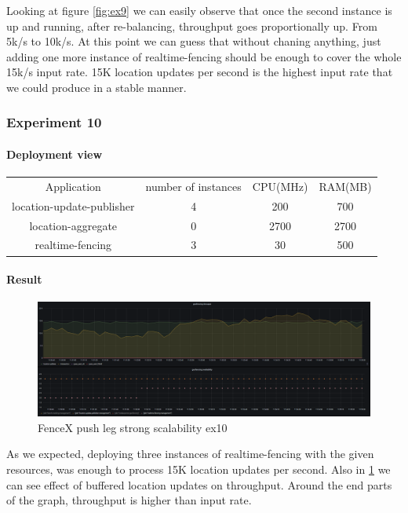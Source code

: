\documentclass[a4]{report}
\begin{document}
        Looking at figure \ref{fig:ex9} we can easily observe that once the second instance is up and running, after
        re-balancing, throughput goes proportionally up.
        From 5k/s to 10k/s.
        At this point we can guess that without chaning anything, just adding one more instance of realtime-fencing
        should be enough to cover the whole 15k/s input rate.
        15K location updates per second is the highest input rate that we could produce in a stable manner.

        \subsubsection{Experiment 10}

        \paragraph{Deployment view}
        \begin{center}
            \begin{tabular}{ c c c c }
                Application               & number of instances & CPU(MHz) & RAM(MB) \\
                location-update-publisher & 4                   & 200      & 700     \\
                location-aggregate        & 0                   & 2700     & 2700    \\
                realtime-fencing          & 3                   & 30       & 500     \\
            \end{tabular}
        \end{center}

        \paragraph{Result}
        \begin{figure}[ht]
            \caption{FenceX push leg strong scalability ex10}
            \label{fig:ex10}
            \includegraphics[scale=0.4]{images/evaluation/ex10-benchmarking-ongoing-2per4sec.png}
        \end{figure}
        As we expected, deploying three instances of realtime-fencing with the given resources, was enough to process 15K
        location updates per second.
        Also in \ref{fig:ex10} we can see effect of buffered location updates on throughput.
        Around the end parts of the graph, throughput is higher than input rate.
\end{document}
